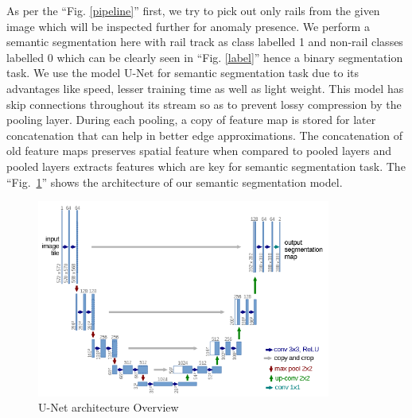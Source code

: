 \documentclass[conference]{IEEEtran}
\begin{document}
As per the ``Fig. \ref{pipeline}'' first, we try to pick out only rails from the given image which will be inspected further for anomaly presence. We perform a semantic segmentation here with rail track as class labelled 1 and non-rail classes labelled 0 which can be clearly seen in ``Fig. \ref{label}'' hence a binary segmentation task. We use the model U-Net \cite{ronneberger2015unet} for semantic segmentation task due to its advantages like speed, lesser training time as well as light weight. This model has skip connections throughout its stream so as to prevent lossy compression by the pooling layer. During each pooling, a copy of feature map is stored for later concatenation that can help in better edge approximations. The concatenation of old feature maps preserves spatial feature when compared to pooled layers and pooled layers extracts features which are key for semantic segmentation task. The ``Fig.~\ref{U-Net}'' shows the architecture of our semantic segmentation model.
\begin{figure}[htbp]
\centerline{\includegraphics[height=6.5cm]{U-Net_model.png}}
\caption{U-Net architecture Overview}
\label{U-Net}
\end{figure} 
\end{document}
